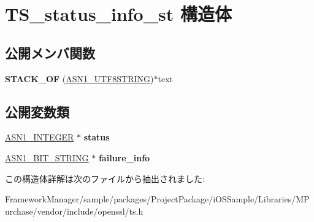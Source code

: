 \hypertarget{struct_t_s__status__info__st}{}\section{T\+S\+\_\+status\+\_\+info\+\_\+st 構造体}
\label{struct_t_s__status__info__st}
\subsection*{公開メンバ関数}
\begin{DoxyCompactItemize}
\item 
\hypertarget{struct_t_s__status__info__st_afbb53add328d781d5b5a48e13a8603c9}{}{\bfseries S\+T\+A\+C\+K\+\_\+\+O\+F} (\hyperlink{structasn1__string__st}{A\+S\+N1\+\_\+\+U\+T\+F8\+S\+T\+R\+I\+N\+G})$\ast$text\label{struct_t_s__status__info__st_afbb53add328d781d5b5a48e13a8603c9}

\end{DoxyCompactItemize}
\subsection*{公開変数類}
\begin{DoxyCompactItemize}
\item 
\hypertarget{struct_t_s__status__info__st_a1bbc97b14de94cd43623becfd70a254e}{}\hyperlink{structasn1__string__st}{A\+S\+N1\+\_\+\+I\+N\+T\+E\+G\+E\+R} $\ast$ {\bfseries status}\label{struct_t_s__status__info__st_a1bbc97b14de94cd43623becfd70a254e}

\item 
\hypertarget{struct_t_s__status__info__st_a20343fe14840039fb382b1b08da0104d}{}\hyperlink{structasn1__string__st}{A\+S\+N1\+\_\+\+B\+I\+T\+\_\+\+S\+T\+R\+I\+N\+G} $\ast$ {\bfseries failure\+\_\+info}\label{struct_t_s__status__info__st_a20343fe14840039fb382b1b08da0104d}

\end{DoxyCompactItemize}


この構造体詳解は次のファイルから抽出されました\+:\begin{DoxyCompactItemize}
\item 
Framework\+Manager/sample/packages/\+Project\+Package/i\+O\+S\+Sample/\+Libraries/\+M\+Purchase/vendor/include/openssl/ts.\+h\end{DoxyCompactItemize}
